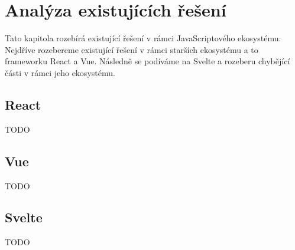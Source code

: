 \chapter{Analýza existujících řešení}

Tato kapitola rozebírá existující řešení v rámci JavaScriptového ekosystému.
Nejdříve rozebereme existující řešení v rámci starších ekosystému a to frameworku React a Vue.
Následně se podíváme na Svelte a rozeberu chybějící části v rámci jeho ekosystému.

\section{React}

TODO

\section{Vue}

TODO

\section{Svelte}

TODO

